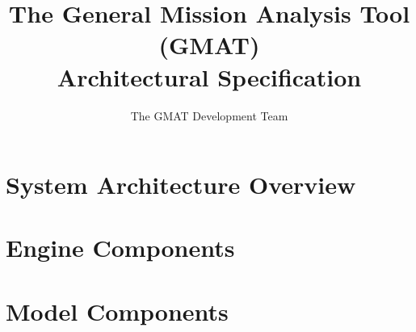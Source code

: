 \documentclass[letterpaper,10pt]{book}
\title{The General Mission Analysis Tool (GMAT)\\Architectural Specification}
\author{The GMAT Development Team}
\begin{document}
\newcommand\chapauthor[2]{\begin{flushleft}\emph{#1}\\\emph{#2}\end{flushleft}}


\thispagestyle{empty}

\frontmatter

\tableofcontents
\clearpage
\listoffigures
\clearpage
\listoftables



\mainmatter

\part{System Architecture Overview}
\clearpage
\clearpage
\thispagestyle{empty}







\part{Engine Components}
\thispagestyle{empty}













\part{Model Components}
\thispagestyle{empty}




%

\end{document}
